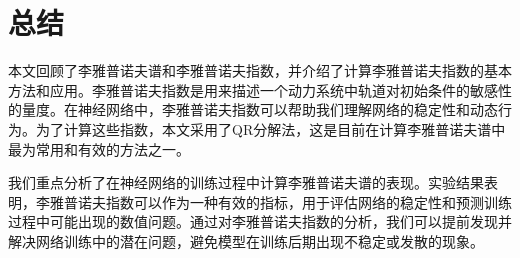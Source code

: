 
\chapter{总结}

本文回顾了李雅普诺夫谱和李雅普诺夫指数，并介绍了计算李雅普诺夫指数的基本方法和应用。李雅普诺夫指数是用来描述一个动力系统中轨道对初始条件的敏感性的量度。在神经网络中，李雅普诺夫指数可以帮助我们理解网络的稳定性和动态行为。为了计算这些指数，本文采用了QR分解法，这是目前在计算李雅普诺夫谱中最为常用和有效的方法之一。

我们重点分析了在神经网络的训练过程中计算李雅普诺夫谱的表现。实验结果表明，李雅普诺夫指数可以作为一种有效的指标，用于评估网络的稳定性和预测训练过程中可能出现的数值问题。通过对李雅普诺夫指数的分析，我们可以提前发现并解决网络训练中的潜在问题，避免模型在训练后期出现不稳定或发散的现象。